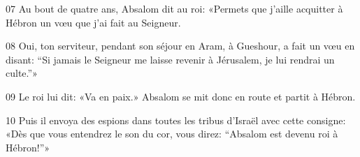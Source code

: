 
07 Au bout de quatre ans, Absalom dit au roi: «Permets que j’aille acquitter à Hébron un vœu que j’ai fait au Seigneur.

08 Oui, ton serviteur, pendant son séjour en Aram, à Gueshour, a fait un vœu en disant: “Si jamais le Seigneur me laisse revenir à Jérusalem, je lui rendrai un culte.”»

09 Le roi lui dit: «Va en paix.» Absalom se mit donc en route et partit à Hébron.

10 Puis il envoya des espions dans toutes les tribus d’Israël avec cette consigne: «Dès que vous entendrez le son du cor, vous direz: “Absalom est devenu roi à Hébron!”»
